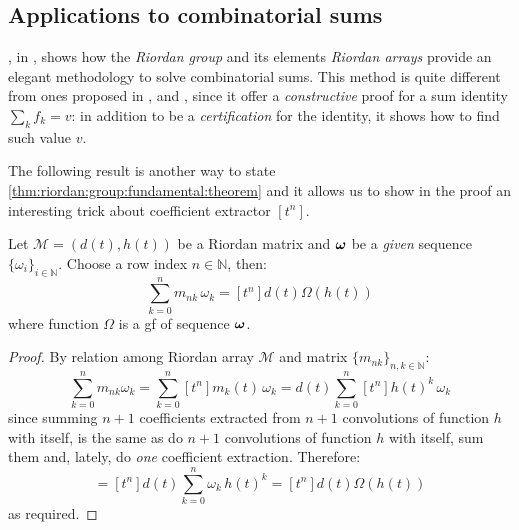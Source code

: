 

\subsection{Applications to combinatorial sums}

\citeauthor{sprugnoli:1991}, in \cite{sprugnoli:1991}, shows how the
\emph{Riordan group} and its elements \emph{Riordan arrays} provide an elegant
methodology to solve combinatorial sums. This method is quite different from
ones proposed in \cite{egorychev:1990}, \cite{wilf:zeilberger:1990} and
\cite{wilf:1989}, since it offer a \emph{constructive} proof for a sum identity
$\sum_{k}f_{k}=v$: 
in addition to be a \emph{certification} for the identity, it shows how to find
such value $v$. 

The following result is another way to state
\autoref{thm:riordan:group:fundamental:theorem} and it allows us to show in the
proof an interesting trick about coefficient extractor $[t^{n}]$. 

\begin{theorem}
    Let $\mathcal{M}=(d(t),h(t))$ be a Riordan matrix and $\boldsymbol{\omega}$ 
    be a \emph{given} sequence $\lbrace\omega_{i}\rbrace_{i\in\mathbb{N}}$. Choose
    a row index $n\in\mathbb{N}$, then:
    \begin{displaymath}
        \sum_{k=0}^{n}{m_{nk}\,\omega_{k}}=[t^{n}]d(t)\Omega(h(t))
    \end{displaymath}
    where function $\Omega$ is a \ac{gf} of sequence $\boldsymbol{\omega}$.
    \label{thm:sprugnoli:riordan:combinatorial:sums}
\end{theorem}

\begin{proof}
    By relation among Riordan array $\mathcal{M}$ and matrix 
    $\lbrace m_{nk}\rbrace_{n,k\in\mathbb{N}}$:
    \begin{displaymath}
        \sum_{k=0}^{n}{m_{nk}\omega_{k}}
            =\sum_{k=0}^{n}{[t^{n}]m_{k}(t)\,\omega_{k}}
            =d(t)\sum_{k=0}^{n}{[t^{n}]h(t)^{k}\,\omega_{k}}
    \end{displaymath}
    since summing $n+1$ coefficients extracted from $n+1$
    convolutions of function $h$ with itself, is the same as
    do $n+1$ convolutions of function $h$ with itself, sum them
    and, lately, do \emph{one} coefficient extraction. Therefore:
    \begin{displaymath}
        =[t^{n}]d(t)\sum_{k=0}^{n}{\omega_{k}\,h(t)^{k}}
        =[t^{n}]d(t)\Omega(h(t))
    \end{displaymath}
    as required.
\end{proof}


